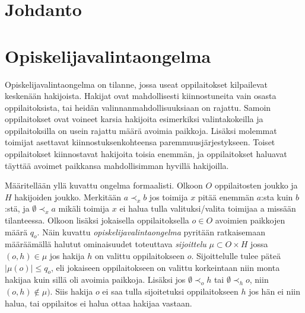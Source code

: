 \documentclass[gradu, twoside]{tktltiki}
\begin{document}
\title{}
\author{Jani Rahkola}
\date{\today}
\numberofpagesinformation{}



\maketitle

\doublespacing

\subject{Tietojenkäsittelytiede}

\begin{abstract}
\end{abstract}

\mytableofcontents

\section{Johdanto}

\section{Opiskelijavalintaongelma}

Opiskelijavalintaongelma on tilanne, jossa useat oppilaitokset
kilpailevat keskenään hakijoista. Hakijat ovat mahdollisesti
kiinnostuneita vain osasta oppilaitoksista, tai heidän
valinnanmahdollisuuksiaan on rajattu. Samoin oppilaitokset ovat
voineet karsia hakijoita esimerkiksi valintakokeilla ja
oppilaitoksilla on usein rajattu määrä avoimia paikkoja. Lisäksi
molemmat toimijat asettavat kiinnostuksenkohteensa
paremmuusjärjestykseen. Toiset oppilaitokset kiinnostavat hakijoita
toisia enemmän, ja oppilaitokset haluavat täyttää avoimet paikkansa
mahdollisimman hyvillä hakijoilla.

Määritellään yllä kuvattu ongelma formaalisti. Olkoon $O$
oppilaitosten joukko ja $H$ hakijoiden joukko. Merkitään $a \prec_x b$
jos toimija $x$ pitää enemmän $a$:sta kuin $b$:stä, ja $\emptyset
\prec_x a$ mikäli toimija $x$ ei halua tulla valituksi/valita toimijaa
a missään tilanteessa. Olkoon lisäksi jokaisella oppilaitoksella $o
\in O$ avoimien paikkojen määrä $q_o$. Näin kuvattu
\emph{opiskelijavalintaongelma} pyritään ratkaisemaan määräämällä
halutut ominaisuudet toteuttava \emph{sijoittelu} $\mu \subset O
\times H$ jossa $(o, h) \in \mu$ jos hakija $h$ on valittu
oppilaitokseen $o$. Sijoittelulle tulee päteä $|\mu(o)| \leq q_o$, eli
jokaiseen oppilaitokseen on valittu korkeintaan niin monta hakijaa
kuin sillä oli avoimia paikkoja. Lisäksi jos $\emptyset \prec_o h$ tai
$\emptyset \prec_h o$, niin $(o, h) \notin \mu)$. Siis hakija $o$ ei
saa tulla sijoitetuksi oppilaitokseen $h$ jos hän ei niin halua, tai
oppilaitos ei halua ottaa hakijaa vastaan.
\end{document}
